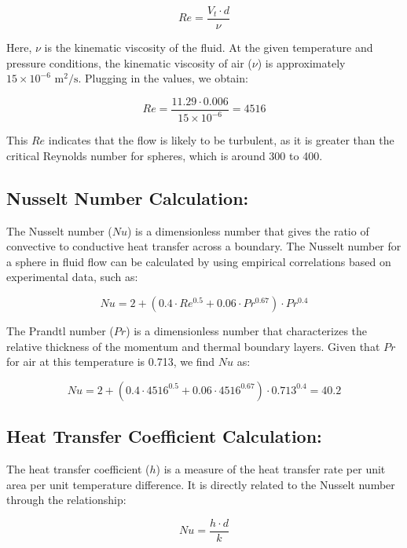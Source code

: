 \documentclass{article}
\numberwithin{equation}{section}
\begin{document}
\begin{equation}
Re = \frac{V_t \cdot d}{\nu}
\end{equation}

Here, \(\nu\) is the kinematic viscosity of the fluid. At the given temperature and pressure conditions, the kinematic viscosity of air (\(\nu\)) is approximately \(15 \times 10^{-6} \text{ m}^2/\text{s}\). Plugging in the values, we obtain:

\begin{equation}
Re = \frac{11.29 \cdot 0.006}{15 \times 10^{-6}} = 4516
\end{equation}

This \(Re\) indicates that the flow is likely to be turbulent, as it is greater than the critical Reynolds number for spheres, which is around 300 to 400.

\subsection*{Nusselt Number Calculation:}
The Nusselt number (\(Nu\)) is a dimensionless number that gives the ratio of convective to conductive heat transfer across a boundary. The Nusselt number for a sphere in fluid flow can be calculated by using empirical correlations based on experimental data, such as:

\begin{equation}
Nu = 2 + (0.4 \cdot Re^{0.5} + 0.06 \cdot Pr^{0.67}) \cdot Pr^{0.4}
\end{equation}

The Prandtl number (\(Pr\)) is a dimensionless number that characterizes the relative thickness of the momentum and thermal boundary layers. Given that \(Pr\) for air at this temperature is 0.713, we find \(Nu\) as:

\begin{equation}
Nu = 2 + (0.4 \cdot 4516^{0.5} + 0.06 \cdot 4516^{0.67}) \cdot 0.713^{0.4} = 40.2
\end{equation}

\subsection*{Heat Transfer Coefficient Calculation:}
The heat transfer coefficient (\(h\)) is a measure of the heat transfer rate per unit area per unit temperature difference. It is directly related to the Nusselt number through the relationship:

\begin{equation}
Nu = \frac{h \cdot d}{k}
\end{equation}
\end{document}

